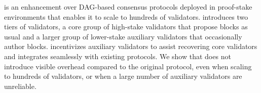 \sysname is an enhancement over DAG-based consensus protocols deployed in proof-stake environments that enables it to scale to hundreds of validators. \sysname introduces two tiers of validators, a core group of high-stake validators that propose blocks as usual and a larger group of lower-stake auxiliary validators that occasionally author blocks. \sysname incentivizes auxiliary validators to assist recovering core validators and integrates seamlessly with existing protocols. We show that \sysname does not introduce visible overhead compared to the original protocol, even when scaling to hundreds of validators, or when a large number of auxiliary validators are unreliable.
